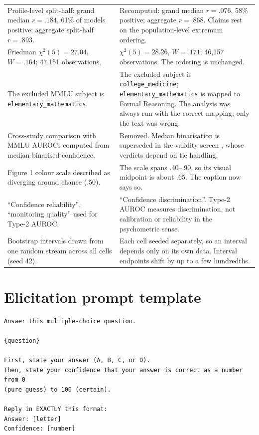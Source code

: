 \begin{table}[!htbp]
\begin{tabular}{p{}p{}}
\addlinespace
Profile-level split-half: grand median $r = .184$, 61\% of models positive; aggregate split-half $r = .893$. & Recomputed: grand median $r = .076$, 58\% positive; aggregate $r = .868$. Claims rest on the population-level extremum ordering. \\
\addlinespace
Friedman $\chi^2(5) = 27.04$, $W = .164$; 47{,}151 observations. & $\chi^2(5) = 28.26$, $W = .171$; 46{,}157 observations. The ordering is unchanged. \\
\addlinespace
The excluded MMLU subject is \texttt{elementary\_mathematics}. & The excluded subject is \texttt{college\_medicine}; \texttt{elementary\_mathematics} is mapped to Formal Reasoning. The analysis was always run with the correct mapping; only the text was wrong. \\
\addlinespace
Cross-study comparison with MMLU AUROCs computed from median-binarised confidence. & Removed. Median binarisation is superseded in the validity screen \citep{cacioli2026e}, whose verdicts depend on tie handling. \\
\addlinespace
Figure 1 colour scale described as diverging around chance (.50). & The scale spans .40--.90, so its visual midpoint is about .65. The caption now says so. \\
\addlinespace
``Confidence reliability'', ``monitoring quality'' used for Type-2 AUROC. & ``Confidence discrimination''. Type-2 AUROC measures discrimination, not calibration or reliability in the psychometric sense. \\
\addlinespace
Bootstrap intervals drawn from one random stream across all cells (seed 42). & Each cell seeded separately, so an interval depends only on its own data. Interval endpoints shift by up to a few hundredths. \\
\bottomrule
\end{tabular}
\end{table}

\section{Elicitation prompt template}
\label{app:prompt}

\begin{verbatim}
Answer this multiple-choice question.

{question}

First, state your answer (A, B, C, or D).
Then, state your confidence that your answer is correct as a number from 0
(pure guess) to 100 (certain).

Reply in EXACTLY this format:
Answer: [letter]
Confidence: [number]
\end{verbatim}

